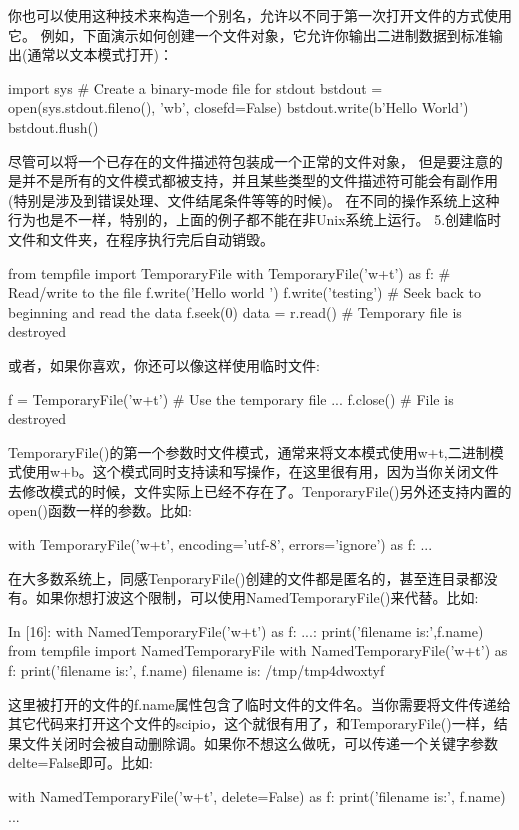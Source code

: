 你也可以使用这种技术来构造一个别名，允许以不同于第一次打开文件的方式使用它。 例如，下面演示如何创建一个文件对象，它允许你输出二进制数据到标准输出(通常以文本模式打开)：
\begin{python}
import sys
# Create a binary-mode file for stdout
bstdout = open(sys.stdout.fileno(), 'wb', closefd=False)
bstdout.write(b'Hello World\n')
bstdout.flush()
\end{python}
尽管可以将一个已存在的文件描述符包装成一个正常的文件对象， 但是要注意的是并不是所有的文件模式都被支持，并且某些类型的文件描述符可能会有副作用 (特别是涉及到错误处理、文件结尾条件等等的时候)。 在不同的操作系统上这种行为也是不一样，特别的，上面的例子都不能在非Unix系统上运行。
5.创建临时文件和文件夹，在程序执行完后自动销毁。
\begin{python}
from tempfile import TemporaryFile
with TemporaryFile('w+t') as f:
    # Read/write to the file
    f.write('Hello world \n')
    f.write('testing\n')
    # Seek back to beginning and read the data
    f.seek(0)
    data = r.read()
# Temporary file is destroyed
\end{python}
或者，如果你喜欢，你还可以像这样使用临时文件:
\begin{python}
f = TemporaryFile('w+t')
# Use the temporary file
...
f.close()
# File is destroyed
\end{python}
TemporaryFile()的第一个参数时文件模式，通常来将文本模式使用w+t,二进制模式使用w+b。这个模式同时支持读和写操作，在这里很有用，因为当你关闭文件去修改模式的时候，文件实际上已经不存在了。TenporaryFile()另外还支持内置的open()函数一样的参数。比如:
\begin{python}
with TemporaryFile('w+t', encoding='utf-8', errors='ignore') as f:
    ...
\end{python}
在大多数系统上，同感TenporaryFile()创建的文件都是匿名的，甚至连目录都没有。如果你想打波这个限制，可以使用NamedTemporaryFile()来代替。比如:
\begin{python}
In [16]: with NamedTemporaryFile('w+t') as f:
    ...:     print('filename is:',f.name)
from tempfile import NamedTemporaryFile
with NamedTemporaryFile('w+t') as f:
    print('filename is:', f.name)
filename is: /tmp/tmp4dwoxtyf
\end{python}
这里被打开的文件的f.name属性包含了临时文件的文件名。当你需要将文件传递给其它代码来打开这个文件的scipio，这个就很有用了，和TemporaryFile()一样，结果文件关闭时会被自动删除调。如果你不想这么做呒，可以传递一个关键字参数delte=False即可。比如:
\begin{python}
with NamedTemporaryFile('w+t', delete=False) as f:
    print('filename is:', f.name)
    ...
\end{python}
